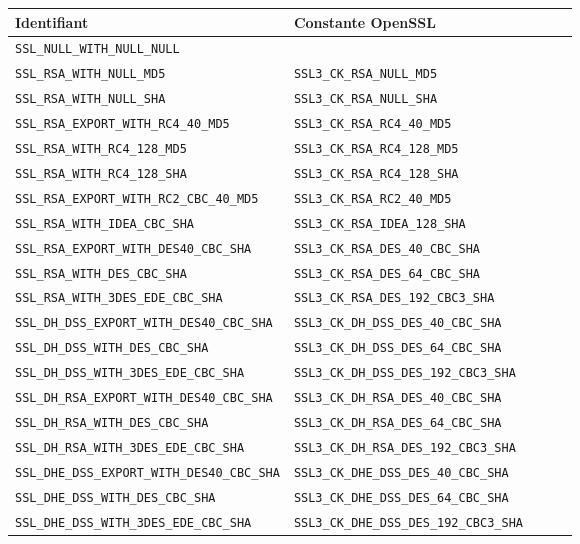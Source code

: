\begin{table}[H]
\centering
\begin{tabularx}{17cm}{|l|X|l|X|l|}
\hline
\textbf{Identifiant} & \textbf{Constante OpenSSL} \\
\hline
\verb+SSL_NULL_WITH_NULL_NULL+&\\
\hline
\verb+SSL_RSA_WITH_NULL_MD5+&\verb+SSL3_CK_RSA_NULL_MD5+\\
\hline 
\verb+SSL_RSA_WITH_NULL_SHA+&\verb+SSL3_CK_RSA_NULL_SHA+\\
\hline 
\verb+SSL_RSA_EXPORT_WITH_RC4_40_MD5+&\verb+SSL3_CK_RSA_RC4_40_MD5+\\
\hline
\verb+SSL_RSA_WITH_RC4_128_MD5+&\verb+SSL3_CK_RSA_RC4_128_MD5+\\
\hline
\verb+SSL_RSA_WITH_RC4_128_SHA+ &\verb+SSL3_CK_RSA_RC4_128_SHA+\\
\hline
\verb+SSL_RSA_EXPORT_WITH_RC2_CBC_40_MD5+&\verb+SSL3_CK_RSA_RC2_40_MD5+ \\
\hline
\verb+SSL_RSA_WITH_IDEA_CBC_SHA+& \verb+SSL3_CK_RSA_IDEA_128_SHA+\\
\hline
\verb+SSL_RSA_EXPORT_WITH_DES40_CBC_SHA+&\verb+SSL3_CK_RSA_DES_40_CBC_SHA+\\
\hline
\verb+SSL_RSA_WITH_DES_CBC_SHA+& \verb+SSL3_CK_RSA_DES_64_CBC_SHA+\\
\hline
\verb+SSL_RSA_WITH_3DES_EDE_CBC_SHA+& \verb+SSL3_CK_RSA_DES_192_CBC3_SHA+\\
\hline
\verb+SSL_DH_DSS_EXPORT_WITH_DES40_CBC_SHA+&\verb+SSL3_CK_DH_DSS_DES_40_CBC_SHA+\\
\hline
\verb+SSL_DH_DSS_WITH_DES_CBC_SHA+ & \verb+SSL3_CK_DH_DSS_DES_64_CBC_SHA+\\
\hline 
\verb+SSL_DH_DSS_WITH_3DES_EDE_CBC_SHA+ & \verb+SSL3_CK_DH_DSS_DES_192_CBC3_SHA+\\
\hline
\verb+SSL_DH_RSA_EXPORT_WITH_DES40_CBC_SHA+ & \verb+SSL3_CK_DH_RSA_DES_40_CBC_SHA+\\
\hline
\verb+SSL_DH_RSA_WITH_DES_CBC_SHA+ & \verb+SSL3_CK_DH_RSA_DES_64_CBC_SHA+\\
\hline
\verb+SSL_DH_RSA_WITH_3DES_EDE_CBC_SHA+ & \verb+SSL3_CK_DH_RSA_DES_192_CBC3_SHA+\\
\hline
\verb+SSL_DHE_DSS_EXPORT_WITH_DES40_CBC_SHA+ & \verb+SSL3_CK_DHE_DSS_DES_40_CBC_SHA+\\
\hline
\verb+SSL_DHE_DSS_WITH_DES_CBC_SHA+ & \verb+SSL3_CK_DHE_DSS_DES_64_CBC_SHA+\\
\hline
\verb+SSL_DHE_DSS_WITH_3DES_EDE_CBC_SHA+ & \verb+SSL3_CK_DHE_DSS_DES_192_CBC3_SHA+\\

\end{tabularx}
\end{table}
